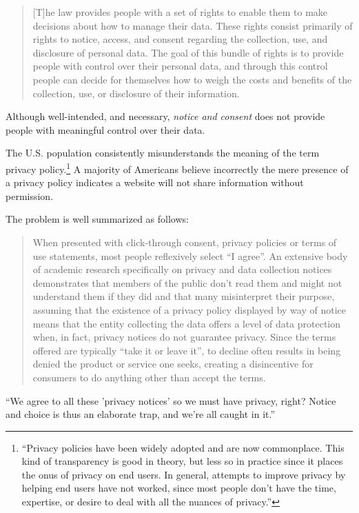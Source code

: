 \documentclass[11pt, oneside]{article}   	%
\begin{document}
\begin{quote}
	[T]he law provides people with a set of rights to enable them to make decisions about how to manage their data. These rights consist primarily of rights to notice, access, and consent regarding the collection, use, and disclosure of personal data. The goal of this bundle of rights is to provide people with control over their  personal data, and through this  control people can decide for themselves how to weigh the costs and benefits of the collection, use, or disclosure of their information.\cite{Solove2012}
\end{quote} 

Although well-intended, and necessary, \emph{notice and consent} does not provide people with meaningful control over their data. 

The U.S. population consistently misunderstands the meaning of the term privacy policy.\footnote{``Privacy policies have been widely adopted and are now commonplace. This kind of transparency is good in theory, but less so in practice since it places the onus of privacy on end users. In general, attempts to improve privacy by helping end users have not worked, since most people don't have the time, expertise, or desire to deal with all the nuances of privacy.''\cite{Hong2023}} A majority of Americans believe incorrectly the mere presence of a privacy policy indicates a website will not share information without permission.\cite{Draper2019} 

The problem is well summarized as follows:
\begin{quote}
	When presented with click-through consent, privacy policies or terms of use statements, most people reflexively select ``I agree''. An extensive body of academic research specifically on privacy and data collection notices demonstrates that members of the public don't read them and might not understand them if they did and that many misinterpret their purpose, assuming that the existence of a privacy policy displayed by way of notice means that the entity collecting the data offers a level of data protection when, in fact, privacy notices do not guarantee privacy. Since the terms offered are typically ``take it or leave it'', to decline often results in being denied the product or service one seeks, creating a disincentive for consumers to do anything other than accept the terms.\cite{Flanagan2020}
\end{quote}

``We agree to all these 'privacy notices' so we must have privacy, right? Notice and choice is thus an elaborate trap, and we're all caught in it.''\cite{Richards2021}
\end{document}

